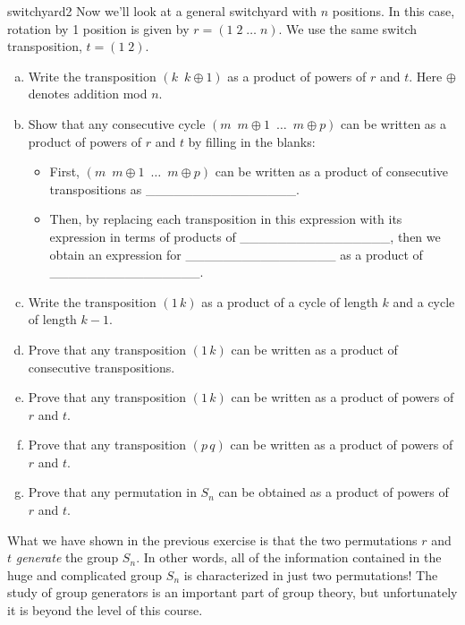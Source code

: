 \begin{exercise}{switchyard2}
Now we'll look at a general switchyard with $n$ positions. In this case, rotation by 1 position is given by  $r= (1 \; 2 \; \ldots \; n)$. We  use the same switch transposition, $t = (1 \; 2)$.
\begin{enumerate}[(a)]
\item
Write the transposition $(k \enspace k\oplus 1)$ as a product of powers of $r$ and $t$. Here $\oplus$ denotes addition mod $n$.
\item
Show that any consecutive cycle $(m \enspace m\oplus 1 \enspace \ldots \enspace m \oplus  p )$ can be written as a product of powers of $r$ and $t$ by filling in the blanks:

\begin{itemize}
\item
First, $(m \enspace m \oplus 1 \enspace \ldots \enspace m \oplus  p )$ can be written as a product of consecutive transpositions as \_\_\_\_\_\_\_\_\_\_\_\_\_\_\_\_.
\item
Then, by replacing each transposition in this expression with its expression in terms of  products of \_\_\_\_\_\_\_\_\_\_\_\_\_\_\_\_, then we obtain an expression for \_\_\_\_\_\_\_\_\_\_\_\_\_\_\_\_ as a product of \_\_\_\_\_\_\_\_\_\_\_\_\_\_\_\_.
\end{itemize}

\item
Write the transposition $(1 \, k)$ as a product of a cycle of length $k$ and a cycle of length $k-1$. 
\item
Prove that any transposition $(1 \, k)$ can be written as a product of consecutive transpositions.
\item
Prove that any transposition $(1 \, k)$ can be written as a product of powers of $r$ and $t$.
\item
Prove that any transposition $(p \, q)$ can be written as a product of powers of $r$ and $t$.
\item
Prove that any permutation in $S_n$ can be obtained as a product of powers of $r$ and $t$.
\end{enumerate}
\end{exercise}
What we have shown in the previous exercise is that the two permutations $r$ and $t$ \emph{generate} the group $S_n$. In other words, all of the information contained in the huge and complicated group $S_n$ is characterized in just two permutations! The study of group generators is an important part of group theory, but unfortunately it is beyond the level of this course.  


